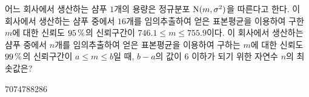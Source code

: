 어느 회사에서 생산하는 샴푸 $1$개의 용량은 정규분포 $\mathrm{N}(m{,}\mkern3mu\mathopen{}\sigma^2)$을 따른다고 한다. 이 회사에서 생산하는 샴푸 중에서 $16$개를 임의추출하여 얻은 표본평균을 이용하여 구한 \mbox{$m$에} 대한 신뢰도 $95\mkern3mu \%$의 신뢰구간이 $746.1\le m\le 755.9$이다. 이 회사에서 생산하는 샴푸 중에서 $n$개를 임의추출하여 얻은 표본평균을 이용하여 구하는 $m$에 대한 신뢰도 $99\mkern3mu \%$의 신뢰구간이 $a\le m\le b$일 때, $b-a$의 값이 $6$ 이하가 되기 위한 자연수 $n$의 최솟값은? 
\begin{choices32}{$70$}{$74$}{$78$}{$82$}{$86$}\end{choices32}
